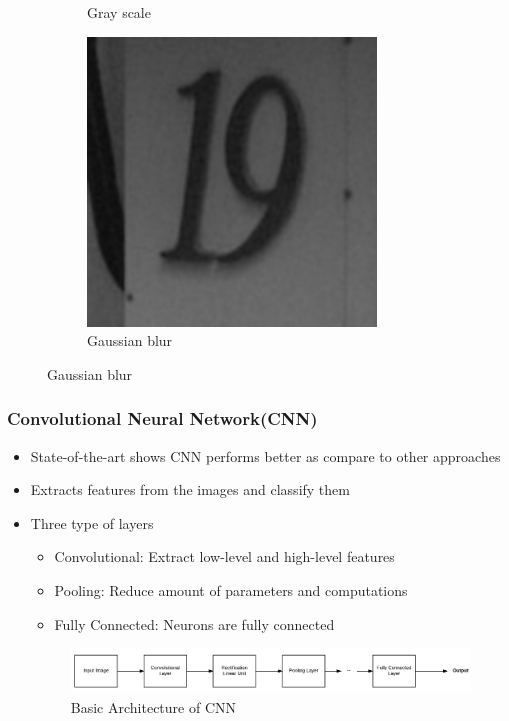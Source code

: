 \documentclass[11.5pt,aspectratio=1610,xcolor={usenames,dvipsnames,table}]{beamer}
\begin{document}
\begin{frame}
\begin{figure}[!h]
\begin{subfigure}{0.3\textwidth}
\caption{Gray scale}
\end{subfigure}
\begin{subfigure}{0.3\textwidth}
\includegraphics*[width=0.9 \textwidth]{19_b.png}
\caption{Gaussian blur}
\end{subfigure}
\end{figure}
\end{frame}

\begin{frame}

\frametitle{Convolutional Neural Network(CNN)}

\begin{itemize}
	\item State-of-the-art shows CNN performs better as compare to other approaches\cite{cnn}
	\item Extracts features from the images and classify them
	\item Three type of layers
		\begin{itemize}
			\item Convolutional: Extract low-level and high-level features
			\item Pooling: Reduce amount of parameters and computations
			\item Fully Connected: Neurons are fully connected
		\end{itemize}	
	\begin{figure}[!h]
		\includegraphics[width=\textwidth]{cnn.png}
		\caption{Basic Architecture of CNN }
		
	\end{figure}

\end{itemize}
\end{frame}
\end{document}
